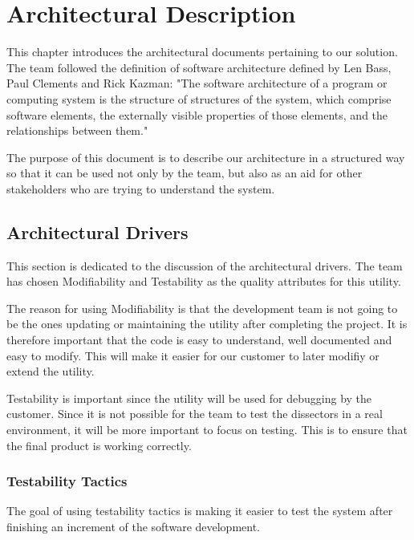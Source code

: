 \chapter{Architectural Description}
This chapter introduces the architectural documents pertaining to our solution. The team followed the definition of software architecture defined by Len Bass, Paul Clements and Rick Kazman: "The software architecture of a program or computing
system is the structure of structures of the system, which comprise software elements, the externally visible properties of those elements, and the relationships between them."\cite[p.3]{Bass2003}

The purpose of this document is to describe our architecture in a structured way so that it can be used not only by the team, but also as an aid for other stakeholders who are trying to understand the system.


\section{Architectural Drivers}
This section is dedicated to the discussion of the architectural drivers.
The team has chosen Modifiability and Testability as the quality attributes for this \gls{utility}. 

The reason for using Modifiability is that the development team is not going to be the ones updating or maintaining the \gls{utility} after completing the project. It is therefore important that the code is easy to understand, well documented and easy to modify. This will make it easier for our customer to later modifiy or extend the \gls{utility}.

Testability is important since the \gls{utility} will be used for debugging by the customer.  Since it is not possible for the team to test the \glspl{dissector} in a real environment, it will be more important to focus on testing. This is to ensure that the final product is working correctly.

\subsection{Testability Tactics}
The goal of using testability tactics is making it easier to test the system after finishing an increment of the software development. 

